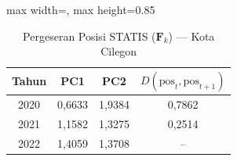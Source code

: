 \begin{table}[H]
\centering
\caption{Pergeseran Posisi STATIS ($\mathbf{F}_k$) --- Kota Cilegon} \label{tab:sample2jarak_statis_skor_kota_cilegon}
\begin{adjustbox}{max width=\textwidth, max height=0.85\textheight}
\begin{tabular}{|c|c|c|c|}
\hline
\textbf{Tahun} & \textbf{PC1} & \textbf{PC2} & \textbf{$D(\text{pos}_t, \text{pos}_{t+1})$} \\
\hline
2020 & 0,6633 & 1,9384 & 0,7862 \\
2021 & 1,1582 & 1,3275 & 0,2514 \\
2022 & 1,4059 & 1,3708 & -- \\
\hline
\end{tabular}
\end{adjustbox}
\end{table}